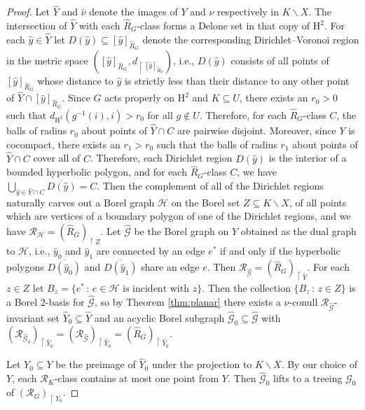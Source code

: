 \documentclass[11pt]{amsart}
\theoremstyle{definition}
\theoremstyle{plain}
\newcommand{\<}{\langle}
\renewcommand{\>}{\rangle}
\newcommand{\HH}{\bm{\mathrm{H}}}
\newcommand{\ol}[1]{\overline{#1}}
\newcommand{\wh}[1]{\widehat{#1}}
\newcommand{\Ggraph}{\mathcal{G}}
\newcommand{\Hgraph}{\mathcal{H}}
\newcommand\RR{\mathscr{R}}
\begin{document}
\begin{proof}
Let $\wh{Y}$ and $\wh{\nu}$ denote the images of $Y$ and $\nu$ respectively in $K\backslash X$. 
The intersection of $\wh{Y}$ with each $\wh{R}_G$-class forms a Delone set in that copy of $\HH ^2$. 
For each $\wh{y}\in\wh{Y}$ let $D(\wh{y})\subseteq [\wh{y}]_{\wh{R}_G}$ denote the corresponding Dirichlet--Voronoi region in the metric space $([\wh{y}]_{\wh{R}_G}, d_{\restriction [\wh{y}]_{\wh{R}_G}})$, i.e., $D(\wh{y})$ consists of all points of $[\wh{y}]_{\wh{R}_G}$ whose distance to $\wh{y}$ is strictly less than their distance to any other point of $\wh{Y}\cap [\wh{y}]_{\wh{R}_G}$. Since $G$ acts properly on $\HH ^2$ and $K\subseteq U$, there exists an $r_0 > 0$ such that $d_{\HH ^2}(g^{-1}(i),i ) > r_0$ for all $g\not\in U$. Therefore, for each $\wh{R}_G$-class $C$, the balls of radius $r_0$ about points of $\wh{Y}\cap C$ are pairwise disjoint. Moreover, since $Y$ is cocompact, there exists an $r_1>r_0$ such that the balls of radius $r_1$ about points of $\wh{Y}\cap C$ cover all of $C$.
Therefore, each Dirichlet region $D(\wh{y})$ is the interior of a bounded hyperbolic polygon, and for each $\wh{R}_G$-class $C$, we have $\bigcup _{\wh{y}\in \wh{Y}\cap C} \ol{D(\wh{y})} = C$. Then the complement of all of the Dirichlet regions naturally carves out a Borel graph ${\Hgraph}$ on the Borel set $Z\subseteq K\backslash X$, of all points which are vertices of a boundary polygon of one of the Dirichlet regions, and we have $\RR_{{\Hgraph}}=(\wh{R}_{G})_{\restriction Z}$.
Let $\wh{{\Ggraph}}$ be the Borel graph on $\wh{Y}$ obtained as the dual graph to ${\Hgraph}$, i.e., $\wh{y}_0$ and $\wh{y}_1$ are connected by an edge $e^*$ if and only if the hyperbolic polygons $\ol{D(\wh{y}_0)}$ and $\ol{D(\wh{y}_1)}$ share an edge $e$. Then $\RR_{\wh{{\Ggraph}}}=(\wh{R}_{G})_{\restriction \wh{Y}}$. For each $z\in Z$ let $B_z = \{ e^* \, : \, e\in {\Hgraph}\text{ is incident with }z \}$. Then the collection $\{ B_z \, : \, z\in Z \}$ is a Borel $2$-basis for $\wh{{\Ggraph}}$, so by Theorem \ref{thm:planar} there exists a $\wh{\nu}$-conull $\RR_{\wh{{\Ggraph}}}$-invariant set $\wh{Y}_0\subseteq \wh{Y}$ and an acyclic Borel subgraph $\wh{{\Ggraph}}_0\subseteq \wh{{\Ggraph}}$ with $(\RR_{\wh{{\Ggraph}}_0})_{\restriction \wh{Y}_0} =(\RR_{\wh{{\Ggraph}}})_{\restriction \wh{Y}_0}=(\wh{R}_{G})_{\restriction \wh{Y}_0}$.

Let $Y_0\subseteq Y$ be the preimage of $\wh{Y}_0$ under the projection to $K\backslash X$. By our choice of $Y$, each $\RR_K$-class contains at most one point from $Y$.
Then $\wh{{\Ggraph}}_0$ lifts to a treeing ${\Ggraph}_0$ of $(\RR_{G})_{\restriction Y_0}$.
\end{proof}
\end{document}
